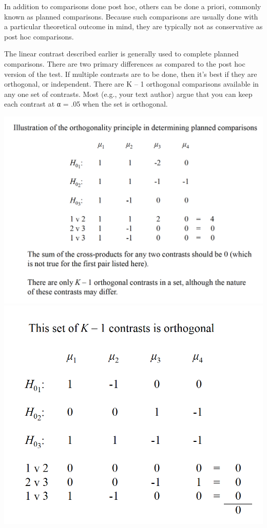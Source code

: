 \documentclass[]{book}
\theoremstyle{definition}
\theoremstyle{definition}
\theoremstyle{definition}
\theoremstyle{remark}
\begin{document}
In addition to comparisons done post hoc, others can be done a priori,
commonly known as planned comparisons. Because such comparisons are
usually done with a particular theoretical outcome in mind, they are
typically not as conservative as post hoc comparisons.

The linear contrast described earlier is generally used to complete
planned comparisons. There are two primary differences as compared to
the post hoc version of the test. If multiple contrasts are to be done,
then it's best if they are orthogonal, or independent. There are K -- 1
orthogonal comparisons available in any one set of contrasts. Most
(e.g., your text author) argue that you can keep each contrast at α =
.05 when the set is orthogonal.

\includegraphics{img/hicksphc16.png}
\includegraphics{img/hicksphc17.png}
\end{document}
